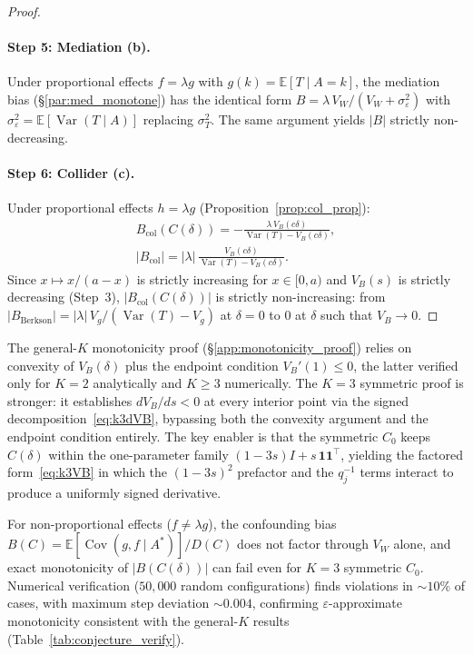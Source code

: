 \begin{proof}
\paragraph{Step 5: Mediation (b).}
Under proportional effects $f=\lambda g$ with $g(k)=\mathbb{E}[T\mid A{=}k]$, the mediation bias
(§\ref{par:med_monotone}) has the identical form
$B=\lambda\,V_W/(V_W+\sigma_\varepsilon^2)$
with $\sigma_\varepsilon^2=\mathbb{E}[\operatorname{Var}(T\mid A)]$ replacing $\sigma_T^2$.
The same argument yields $|B|$ strictly non-decreasing.

\paragraph{Step 6: Collider (c).}
Under proportional effects $h=\lambda g$ (Proposition~\ref{prop:col_prop}):
\begin{gather*}
  B_{\mathrm{col}}(C(\delta)) = -\frac{\lambda\,V_B(c\delta)}{\operatorname{Var}(T)-V_B(c\delta)},\\
  |B_{\mathrm{col}}| = |\lambda|\,\frac{V_B(c\delta)}{\operatorname{Var}(T)-V_B(c\delta)}.
\end{gather*}
Since $x\mapsto x/(a{-}x)$ is strictly increasing for $x\in[0,a)$
and $V_B(s)$ is strictly decreasing (Step~3),
$|B_{\mathrm{col}}(C(\delta))|$ is strictly non-increasing:
from $|B_{\mathrm{Berkson}}|=|\lambda|\,V_g/(\operatorname{Var}(T){-}V_g)$ at $\delta{=}0$
to $0$ at $\delta$ such that $V_B\to 0$.
\end{proof}

\begin{remark}
\label{rem:k3_vs_general}
The general-$K$ monotonicity proof (§\ref{app:monotonicity_proof}) relies on
convexity of $V_B(\delta)$ plus the endpoint condition $V_B'(1)\leq 0$,
the latter verified only for $K{=}2$ analytically and $K\geq 3$ numerically.
The $K{=}3$ symmetric proof is stronger:
it establishes $dV_B/ds<0$ at every interior point via the signed decomposition~\eqref{eq:k3dVB},
bypassing both the convexity argument and the endpoint condition entirely.
The key enabler is that the symmetric $C_0$ keeps $C(\delta)$ within the one-parameter family
$(1{-}3s)I+s\,\mathbf{1}\mathbf{1}^\top$, yielding the factored form~\eqref{eq:k3VB}
in which the $(1{-}3s)^2$ prefactor and the $q_j^{-1}$ terms interact to produce
a uniformly signed derivative.
\end{remark}

\begin{remark}
\label{rem:k3_general}
For non-proportional effects ($f\neq\lambda g$), the confounding bias
$B(C)=\mathbb{E}[\operatorname{Cov}(g,f\mid A^*)]/D(C)$
does not factor through $V_W$ alone,
and exact monotonicity of $|B(C(\delta))|$ can fail even for $K{=}3$ symmetric $C_0$.
Numerical verification ($50{,}000$ random configurations) finds violations in ${\sim}10\%$ of cases,
with maximum step deviation ${\sim}0.004$,
confirming $\varepsilon$-approximate monotonicity consistent with the general-$K$ results
(Table~\ref{tab:conjecture_verify}).
\end{remark}
